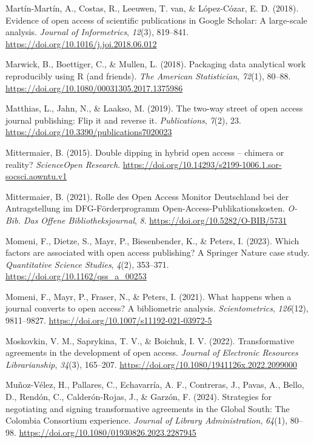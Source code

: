 \documentclass[a4paper,man,floatsintext,longtable,noextraspace,12pt]{apa6}
\newlength{\cslhangindent}
\newenvironment{CSLReferences}[2] %
  {\begin{list}{}{%
   \setlength{\itemindent}{0pt}
   \setlength{\leftmargin}{0pt}
   \setlength{\parsep}{0pt}
   \ifodd #1
    \setlength{\leftmargin}{\cslhangindent}
    \setlength{\itemindent}{-1\cslhangindent}
   \fi
   \setlength{\itemsep}{#2\baselineskip}}}
  {\end{list}}
\begin{document}
\begin{CSLReferences}{1}{0}
Martín-Martín, A., Costas, R., Leeuwen, T. van, \& López-Cózar, E. D.
(2018). Evidence of open access of scientific publications in {Google
Scholar}: A large-scale analysis. \emph{Journal of Informetrics},
\emph{12}(3), 819--841. \url{https://doi.org/10.1016/j.joi.2018.06.012}

Marwick, B., Boettiger, C., \& Mullen, L. (2018). Packaging data
analytical work reproducibly using {R} (and friends). \emph{The American
Statistician}, \emph{72}(1), 80--88.
\url{https://doi.org/10.1080/00031305.2017.1375986}

Matthias, L., Jahn, N., \& Laakso, M. (2019). The two-way street of open
access journal publishing: Flip it and reverse it. \emph{Publications},
\emph{7}(2), 23. \url{https://doi.org/10.3390/publications7020023}

Mittermaier, B. (2015). Double dipping in hybrid open access -- chimera
or reality? \emph{{ScienceOpen} Research}.
\url{https://doi.org/10.14293/s2199-1006.1.sor-socsci.aowntu.v1}

Mittermaier, B. (2021). {Rolle des Open Access Monitor Deutschland bei
der Antragstellung im DFG-Förderprogramm
Open-Access-Publikationskosten}. \emph{{O-Bib. Das Offene
Bibliotheksjournal}}, \emph{8}. \url{https://doi.org/10.5282/O-BIB/5731}

Momeni, F., Dietze, S., Mayr, P., Biesenbender, K., \& Peters, I.
(2023). Which factors are associated with open access publishing? A
{Springer Nature} case study. \emph{Quantitative Science Studies},
\emph{4}(2), 353--371. \url{https://doi.org/10.1162/qss_a_00253}

Momeni, F., Mayr, P., Fraser, N., \& Peters, I. (2021). What happens
when a journal converts to open access? A bibliometric analysis.
\emph{Scientometrics}, \emph{126}(12), 9811--9827.
\url{https://doi.org/10.1007/s11192-021-03972-5}

Moskovkin, V. M., Saprykina, T. V., \& Boichuk, I. V. (2022).
Transformative agreements in the development of open access.
\emph{Journal of Electronic Resources Librarianship}, \emph{34}(3),
165--207. \url{https://doi.org/10.1080/1941126x.2022.2099000}

Muñoz-Vélez, H., Pallares, C., Echavarría, A. F., Contreras, J., Pavas,
A., Bello, D., Rendón, C., Calderón-Rojas, J., \& Garzón, F. (2024).
Strategies for negotiating and signing transformative agreements in the
{Global South}: The {Colombia Consortium} experience. \emph{Journal of
Library Administration}, \emph{64}(1), 80--98.
\url{https://doi.org/10.1080/01930826.2023.2287945}


\end{CSLReferences}
\end{document}
